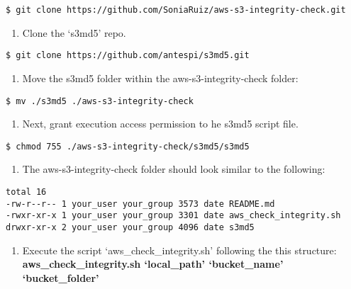 \documentclass[]{book}
\providecommand{\tightlist}{%
  \setlength{\itemsep}{0pt}\setlength{\parskip}{0pt}}
\begin{document}
\begin{verbatim}
$ git clone https://github.com/SoniaRuiz/aws-s3-integrity-check.git
\end{verbatim}

\begin{enumerate}
\def\labelenumi{\arabic{enumi}.}
\setcounter{enumi}{1}
\tightlist
\item
  Clone the `s3md5' repo.
\end{enumerate}

\begin{verbatim}
$ git clone https://github.com/antespi/s3md5.git
\end{verbatim}

\begin{enumerate}
\def\labelenumi{\arabic{enumi}.}
\setcounter{enumi}{2}
\tightlist
\item
  Move the s3md5 folder within the aws-s3-integrity-check folder:
\end{enumerate}

\begin{verbatim}
$ mv ./s3md5 ./aws-s3-integrity-check
\end{verbatim}

\begin{enumerate}
\def\labelenumi{\arabic{enumi}.}
\setcounter{enumi}{3}
\tightlist
\item
  Next, grant execution access permission to he s3md5 script file.
\end{enumerate}

\begin{verbatim}
$ chmod 755 ./aws-s3-integrity-check/s3md5/s3md5
\end{verbatim}

\begin{enumerate}
\def\labelenumi{\arabic{enumi}.}
\setcounter{enumi}{4}
\tightlist
\item
  The aws-s3-integrity-check folder should look similar to the
  following:
\end{enumerate}

\begin{verbatim}
total 16
-rw-r--r-- 1 your_user your_group 3573 date README.md
-rwxr-xr-x 1 your_user your_group 3301 date aws_check_integrity.sh
drwxr-xr-x 2 your_user your_group 4096 date s3md5
\end{verbatim}

\begin{enumerate}
\def\labelenumi{\arabic{enumi}.}
\setcounter{enumi}{5}
\tightlist
\item
  Execute the script `aws\_check\_integrity.sh' following the this
  structure: \textbf{aws\_check\_integrity.sh `local\_path'
  `bucket\_name' `bucket\_folder'}
\end{enumerate}
\end{document}
